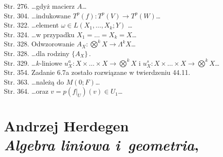\documentclass[a4paper,11pt]{article}
\numberwithin{equation}{section}
\begin{document}
Str. 276. \ldots gdyż macierz $A$\ldots \\
Str. 304. \ldots indukowane
$T^{ p } ( f ) : T^{ p } ( V ) \rightarrow T^{ p } (W)$\ldots \\
Str. 322. \ldots element $\omega \in L( X_{ 1 } ,\ldots, X_{ k }; Y )$ \ldots \\
Str. 324. \ldots w przypadku $X_{ 1 } = \ldots = X_{ k } = X$\ldots \\
Str. 328. Odwzorowanie $A_{ X } : \bigotimes^{ k } X \rightarrow \Lambda^{ k } X$\ldots \\
Str. 328. \ldots dla rodziny $\{ A_{ X } \} \, .$ \\
Str. 329. \ldots $k$-liniowe
$u^{ a }_{ X } : X \times \ldots \times X \rightarrow \bigotimes^{ k } X$ i
$u^{ s }_{ X } : X \times \ldots \times X \rightarrow \bigotimes^{ k } X$\ldots \\
Str. 354. Zadanie \romannumeral6.7a zostało rozwiązane w
twierdzeniu 44.11. \\
Str. 363. \ldots należą do $M( 0; F )$\ldots \\
Str. 364. \ldots oraz $v = p( f |_{ U } ) ( v ) \in U_{ 1 }$\ldots \\


















\newpage

\section{ %
  Andrzej Herdegen \\
  \textit{Algebra liniowa i~geometria},
  \cite{HerdegenAlgebraLiniowaIGeometria2010}}

\vspace{0em}



\vspace{0em}




\end{document}
